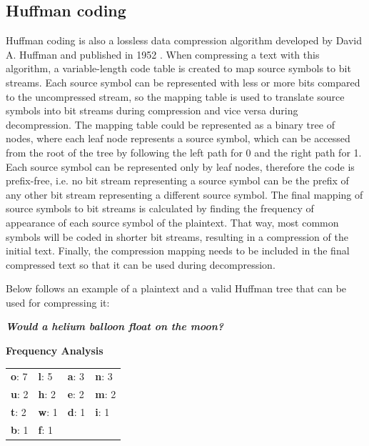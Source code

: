 \subsection{Huffman coding}\label{subsec:huffman}

Huffman coding is also a lossless data compression algorithm developed by David
A. Huffman and published in 1952 \cite{huffman}. When compressing a text with
this algorithm, a variable-length code table is created to map source symbols to
bit streams. Each source symbol can be represented with less or more bits
compared to the uncompressed stream, so the mapping table is used to translate
source symbols into bit streams during compression and vice versa during
decompression. The mapping table could be represented as a binary tree of nodes,
where each leaf node represents a source symbol, which can be accessed from the 
root of the tree by following the left path for 0 and the right path for 1. Each
source symbol can be represented only by leaf nodes, therefore the code is
prefix-free, i.e. no bit stream representing a source symbol can be the prefix
of any other bit stream representing a different source symbol. The final
mapping of source symbols to bit streams is calculated by finding the frequency
of appearance of each source symbol of the plaintext. That way, most common
symbols will be coded in shorter bit streams, resulting in a compression of the 
initial text. Finally, the compression mapping needs to be included in the final
compressed text so that it can be used during decompression.

Below follows an example of a plaintext and a valid Huffman tree that can be
used for compressing it:

\bigskip \centerline{\textit{\textbf{Would a helium balloon float on the moon?}}}

\bigskip \centerline{\textbf{Frequency Analysis}}

\begin{table}[H] \centering \begin{tabular}{ | l | l | l | l | } \hline
\textbf{o}: 7 & \textbf{l}: 5 & \textbf{a}: 3 & \textbf{n}: 3 \\ \textbf{u}: 2 &
\textbf{h}: 2 & \textbf{e}: 2 & \textbf{m}: 2 \\ \textbf{t}: 2 & \textbf{w}: 1 &
\textbf{d}: 1 & \textbf{i}: 1 \\ \textbf{b}: 1 & \textbf{f}: 1 & \textbf{}  & \textbf{}
\\ \hline \end{tabular} \end{table}

